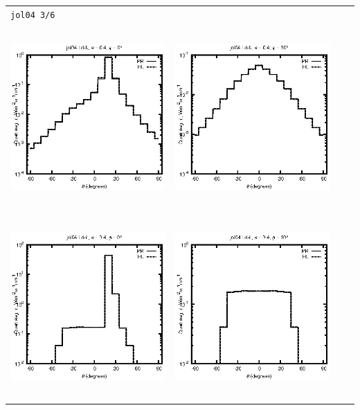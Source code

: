 \begin{tabular}{c c c c}
\multicolumn{4}{l}{\texttt{jol04 3/6}} \\
\includegraphics[height=7cm]{../eps/jol04_Ld_b_fwd.eps} &
\includegraphics[height=7cm]{../eps/jol04_Ld_b_cross.eps} \\
\includegraphics[height=7cm]{../eps/jol04_Ld_it_fwd.eps} &
\includegraphics[height=7cm]{../eps/jol04_Ld_it_cross.eps} \\

\end{tabular}
